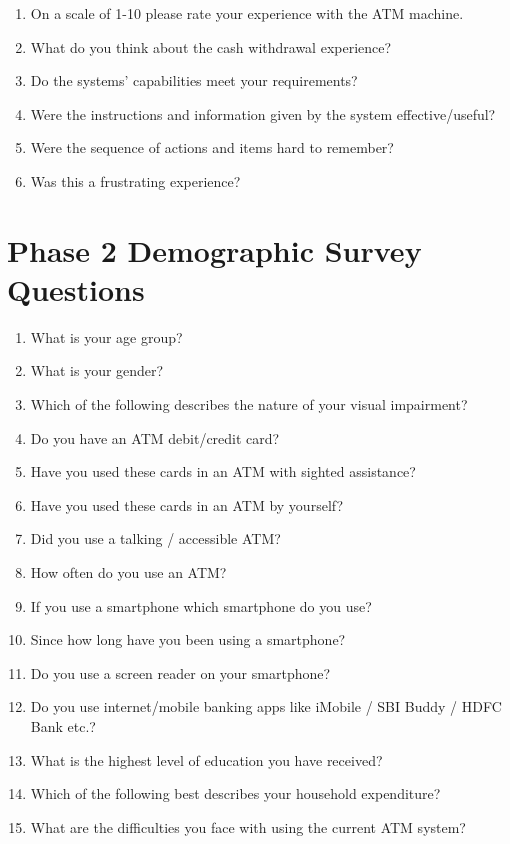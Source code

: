 \begin{enumerate}
    \item On a scale of 1-10 please rate your experience with the ATM machine.
    \item What do you think about the cash withdrawal experience?
    \item Do the systems' capabilities meet your requirements?
    \item Were the instructions and information given by the system effective/useful?
    \item Were the sequence of actions and items hard to remember?
    \item Was this a frustrating experience?
\end{enumerate}

\section{Phase 2 Demographic Survey Questions}
\label{appendix:phase2demographicsurveyquestions}

\begin{enumerate}
    \item What is your age group?
    \item What is your gender?
    \item Which of the following describes the nature of your visual impairment?
    \item Do you have an ATM debit/credit card?
    \item Have you used these cards in an ATM with sighted assistance?
    \item Have you used these cards in an ATM by yourself?
    \item Did you use a talking / accessible ATM?
    \item How often do you use an ATM?
    \item If you use a smartphone which smartphone do you use?
    \item Since how long have you been using a smartphone?
    \item Do you use a screen reader on your smartphone?
    \item Do you use internet/mobile banking apps like iMobile / SBI  Buddy / HDFC Bank etc.?
    \item What is the highest level of education you have received?
    \item Which of the following best describes your household expenditure?
    \item What are the difficulties you face with using the current ATM system?
\end{enumerate}


